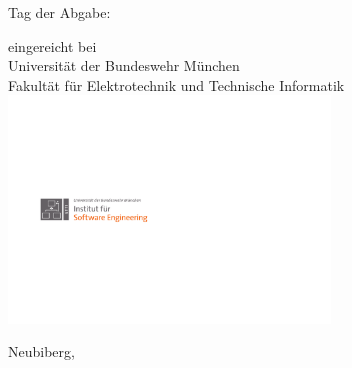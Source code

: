\begin{titlepage}
\begin{center}
\vspace{30pt}

Tag der Abgabe: \thePublicationDate\\ 

\vspace{30pt}

eingereicht bei\\
Universität der Bundeswehr München\\
Fakultät für Elektrotechnik und Technische Informatik\\
\vspace{15pt}
\includegraphics[width=242pt]{images/logos/UniBwM_ETTI_6_geschnitten.pdf}


\vspace{25pt}
Neubiberg, \thePublicationMY 
\end{center}
\end{titlepage}
\textbf{}\cleardoublepage